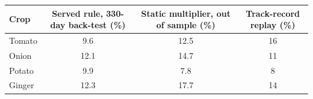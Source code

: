 \renewcommand{\arraystretch}{1.25}
\footnotesize
\begin{tabular}{|l|c|c|c|}
\hline
\textbf{Crop} & \textbf{Served rule, 330-day back-test (\%)} & \textbf{Static multiplier, out of sample (\%)} & \textbf{Track-record replay (\%)} \\
\hline
Tomato & 9.6 & 12.5 & 16 \\
\hline
Onion & 12.1 & 14.7 & 11 \\
\hline
Potato & 9.9 & 7.8 & 8 \\
\hline
Ginger & 12.3 & 17.7 & 14 \\
\hline
\end{tabular}
